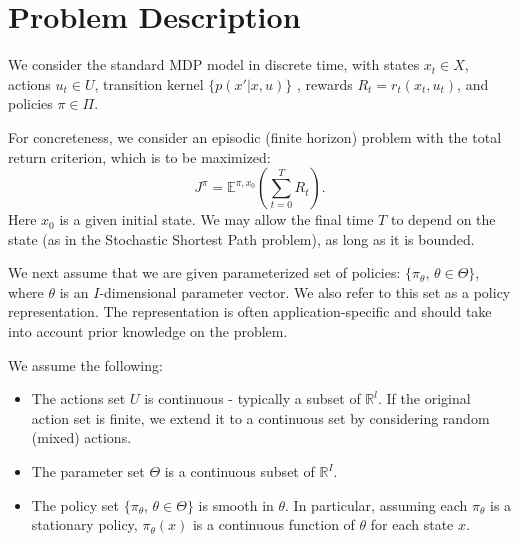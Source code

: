 \section{Problem Description}

We consider the standard MDP model in discrete time, with states  ${x_t} \in X$, actions ${u_t} \in U$, transition kernel $\{ p(x'|x,u)\} $ , rewards  ${R_t} = {r_t}({x_t},{u_t})$, and policies $\pi  \in \Pi $.

For concreteness, we consider an episodic (finite horizon) problem with the total return criterion, which is to be maximized:
\[{J^\pi } = {\mathbb E^{\pi ,{x_0}}}\left(\sum\limits_{t = 0}^T {{R_t}} \right).\]
Here ${x_0}$ is a given initial state. We may allow the final time $T$ to depend on the state (as in the Stochastic Shortest Path problem), as long as it is bounded.

We next assume that we are given parameterized set of policies: $\{ {\pi _\theta },\,\theta  \in \Theta \} $, where $\theta $ is an $I$-dimensional parameter vector. We also refer to this set as a policy representation. The representation is often application-specific and should take into account prior knowledge on the problem.

We assume the following:
\begin{itemize}
  \item The actions set $U$ is continuous - typically a subset of $\mathbb R^l$.
If the original action set is finite, we extend it to a continuous set by considering  random (mixed) actions.
  \item The parameter set $\Theta $ is a continuous subset of $\mathbb R^I$.
  \item The policy set $\{ {\pi _\theta },\,\theta  \in \Theta \} $ is smooth in $\theta $. In particular, assuming each ${\pi _\theta }$ is a stationary policy,  ${\pi _\theta }(x)$ is a continuous function of $\theta $ for each state $x$.
\end{itemize}

